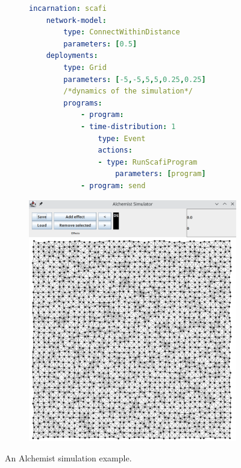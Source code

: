 \documentclass[12pt,a4paper,openright,twoside]{book}
\begin{document}
\begin{figure}
    \centering
    \begin{subfigure}[b]{0.49\textwidth}
        \centering
        \begin{lstlisting}[language=yaml]
    incarnation: scafi
    network-model:
        type: ConnectWithinDistance
        parameters: [0.5]
    deployments:
        type: Grid
        parameters: [-5,-5,5,5,0.25,0.25]
        /*dynamics of the simulation*/
        programs: 
            - program:
            - time-distribution: 1
                type: Event
                actions: 
                - type: RunScafiProgram
                    parameters: [program]
            - program: send
    \end{lstlisting}
    \end{subfigure}
    \hfill
    \begin{subfigure}[b]{0.49\textwidth}
        \centering
        \includegraphics[width=\textwidth]{figures/alchemist.png}
    \end{subfigure}
    \caption{An Alchemist simulation example.}
    \label{fig:alchemist}
    \end{figure}
\end{document}
